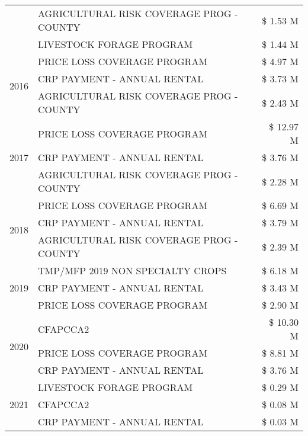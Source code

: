 \begin{tabular}{llr}
 & AGRICULTURAL RISK COVERAGE PROG - COUNTY & \$ 1.53 M \\
 & LIVESTOCK FORAGE PROGRAM & \$ 1.44 M \\
\cline{1-3}
\multirow[t]{3}{*}{2016} & PRICE LOSS COVERAGE PROGRAM                   & \$ 4.97 M \\
 & CRP PAYMENT - ANNUAL RENTAL                   & \$ 3.73 M \\
 & AGRICULTURAL RISK COVERAGE PROG - COUNTY      & \$ 2.43 M \\
\cline{1-3}
\multirow[t]{3}{*}{2017} & PRICE LOSS COVERAGE PROGRAM & \$ 12.97 M \\
 & CRP PAYMENT - ANNUAL RENTAL & \$ 3.76 M \\
 & AGRICULTURAL RISK COVERAGE PROG - COUNTY & \$ 2.28 M \\
\cline{1-3}
\multirow[t]{3}{*}{2018} & PRICE LOSS COVERAGE PROGRAM & \$ 6.69 M \\
 & CRP PAYMENT - ANNUAL RENTAL & \$ 3.79 M \\
 & AGRICULTURAL RISK COVERAGE PROG - COUNTY & \$ 2.39 M \\
\cline{1-3}
\multirow[t]{3}{*}{2019} & TMP/MFP 2019 NON SPECIALTY CROPS & \$ 6.18 M \\
 & CRP PAYMENT - ANNUAL RENTAL & \$ 3.43 M \\
 & PRICE LOSS COVERAGE PROGRAM & \$ 2.90 M \\
\cline{1-3}
\multirow[t]{3}{*}{2020} & CFAPCCA2 & \$ 10.30 M \\
 & PRICE LOSS COVERAGE PROGRAM & \$ 8.81 M \\
 & CRP PAYMENT - ANNUAL RENTAL & \$ 3.76 M \\
\cline{1-3}
\multirow[t]{3}{*}{2021} & LIVESTOCK FORAGE PROGRAM & \$ 0.29 M \\
 & CFAPCCA2 & \$ 0.08 M \\
 & CRP PAYMENT - ANNUAL RENTAL & \$ 0.03 M \\
\cline{1-3}
\bottomrule
\end{tabular}
